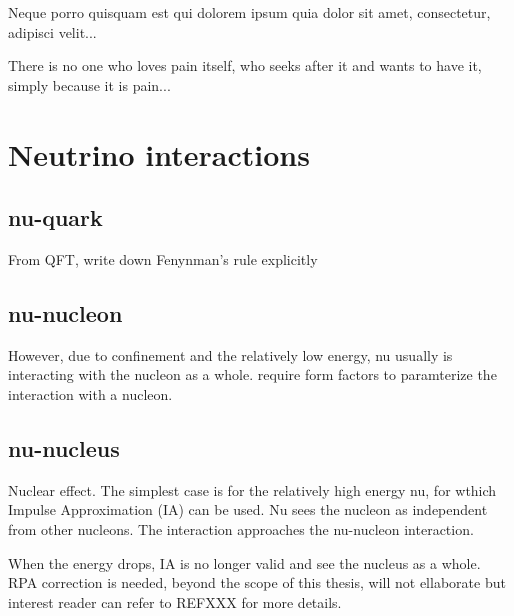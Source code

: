 \begin{savequote}[8cm]
\textlatin{Neque porro quisquam est qui dolorem ipsum quia dolor sit amet, consectetur, adipisci velit...}

There is no one who loves pain itself, who seeks after it and wants to have it, simply because it is pain...
\end{savequote}

\chapter{\label{ch:35-nuint}Neutrino interactions} 
\minitoc

\section{nu-quark}
From QFT, write down Fenynman's rule explicitly

\section{nu-nucleon}
However, due to confinement and the relatively low energy, nu usually is interacting with the nucleon as a whole.
require form factors to paramterize the interaction with a nucleon.

\section{nu-nucleus}
Nuclear effect. 
The simplest case is for the relatively high energy nu, for wthich Impulse Approximation (IA) can be used.
Nu sees the nucleon as independent from other nucleons.
The interaction approaches the nu-nucleon interaction.

When the energy drops, IA is no longer valid and see the nucleus as a whole.
RPA correction is needed, beyond the scope of this thesis, will not ellaborate but interest reader can refer to REFXXX for more details.

